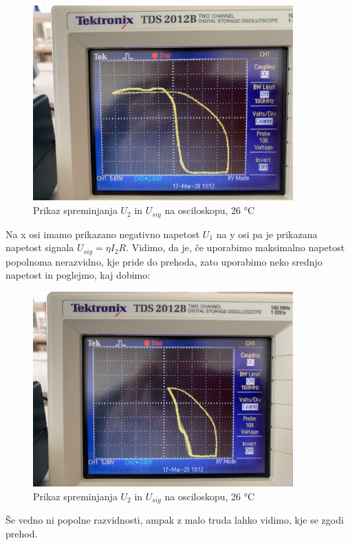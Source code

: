 \documentclass[11pt, a4paper]{article}
\theoremstyle{definition}
\theoremstyle{example}
\theoremstyle{izrek}
\begin{document}
\begin{figure}[H]
    \centering
    \includegraphics[width=10cm]{T=26C_max_napetost.jpg}
    \caption{Prikaz spreminjanja $U_2$ in $U_{sig}$ na osciloskopu, 26 °C}
\end{figure}
Na x osi imamo prikazano negativno napetost $U_1$ na y osi pa je prikazana napetost signala $U_{sig}=\eta I_2 R.$
Vidimo, da je, če uporabimo maksimalno napetost popolnoma nerazvidno, kje pride do prehoda, zato uporabimo neko srednjo napetost in poglejmo, kaj dobimo:
\begin{figure}[H]
    \centering
    \includegraphics[width=10cm]{T=26C_srednja_napetost.jpg}
    \caption{Prikaz spreminjanja $U_2$ in $U_{sig}$ na osciloskopu, 26 °C}
\end{figure}

Še vedno ni popolne razvidnosti, ampak z malo truda lahko vidimo, kje se zgodi prehod.
\end{document}
